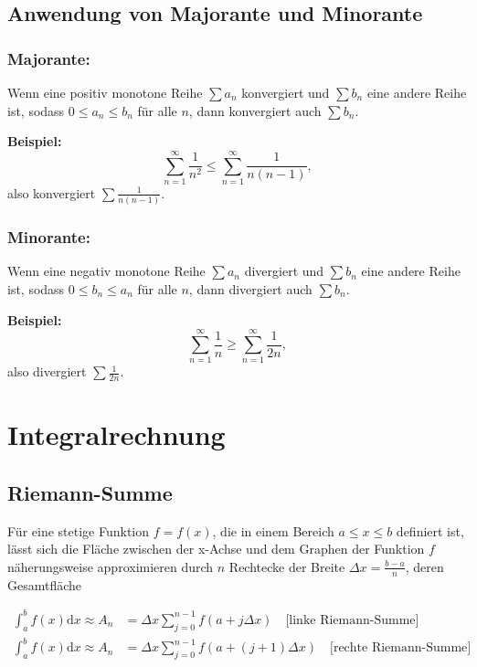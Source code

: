 \documentclass[11pt, openany]{book}
\begin{document}
\subsection{Anwendung von Majorante und Minorante}
\subsubsection{Majorante:} 
Wenn eine positiv monotone Reihe $\sum a_n$ konvergiert und $\sum b_n$ eine andere Reihe ist, sodass $0 \leq a_n \leq b_n$ für alle $n$, dann konvergiert auch $\sum b_n$.

\textbf{Beispiel:}
\[
\sum_{n=1}^{\infty} \frac{1}{n^2} \leq \sum_{n=1}^{\infty} \frac{1}{n(n-1)},
\]
also konvergiert $\sum \frac{1}{n(n-1)}$.

\subsubsection{Minorante:}
Wenn eine negativ monotone Reihe $\sum a_n$ divergiert und $\sum b_n$ eine andere Reihe ist, sodass $0 \leq b_n \leq a_n$ für alle $n$, dann divergiert auch $\sum b_n$.

\textbf{Beispiel:}
\[
\sum_{n=1}^{\infty} \frac{1}{n} \geq \sum_{n=1}^{\infty} \frac{1}{2n},
\]
also divergiert $\sum \frac{1}{2n}$.

\newpage

\section{Integralrechnung}

\subsection{Riemann-Summe}
Für eine stetige Funktion \(f = f(x)\), die in einem Bereich \(a \le x \le b\) definiert ist, lässt sich die Fläche zwischen der x-Achse und dem Graphen der Funktion \(f\) näherungsweise approximieren durch \(n\) Rechtecke der Breite \(\Delta x = \frac{b - a}{n}\), deren Gesamtfläche
\begin{tcolorbox}
\begin{align*}
\int_a^b f(x) \mathrm{d}x \approx A_n &= \Delta x \sum_{j=0}^{n-1} f(a + j \Delta x) \quad \text{[linke Riemann-Summe]} \\
\int_a^b f(x) \mathrm{d}x \approx A_n &= \Delta x \sum_{j=0}^{n-1} f(a + (j + 1) \Delta x) \quad \text{[rechte Riemann-Summe]}    
\end{align*}
\end{tcolorbox}
\end{document}

